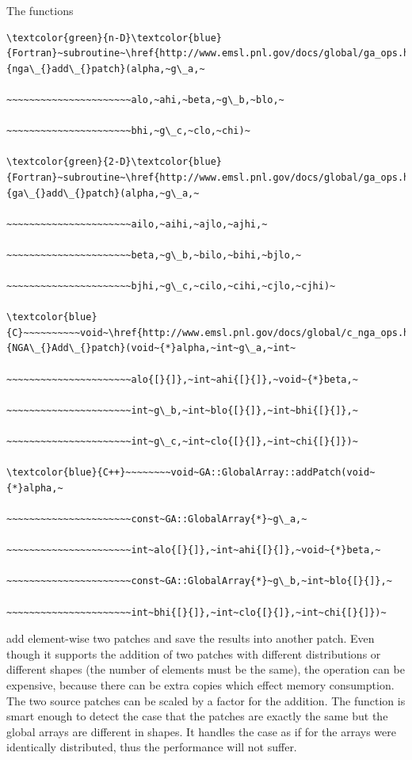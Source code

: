 The functions
\begin{verbatim}
\textcolor{green}{n-D}\textcolor{blue}{Fortran}~subroutine~\href{http://www.emsl.pnl.gov/docs/global/ga_ops.html\#ga_add_patch}{nga\_{}add\_{}patch}(alpha,~g\_a,~

~~~~~~~~~~~~~~~~~~~~~~alo,~ahi,~beta,~g\_b,~blo,~

~~~~~~~~~~~~~~~~~~~~~~bhi,~g\_c,~clo,~chi)~

\textcolor{green}{2-D}\textcolor{blue}{Fortran}~subroutine~\href{http://www.emsl.pnl.gov/docs/global/ga_ops.html\#ga_add_patch}{ga\_{}add\_{}patch}(alpha,~g\_a,~

~~~~~~~~~~~~~~~~~~~~~~ailo,~aihi,~ajlo,~ajhi,~

~~~~~~~~~~~~~~~~~~~~~~beta,~g\_b,~bilo,~bihi,~bjlo,~

~~~~~~~~~~~~~~~~~~~~~~bjhi,~g\_c,~cilo,~cihi,~cjlo,~cjhi)~

\textcolor{blue}{C}~~~~~~~~~~void~\href{http://www.emsl.pnl.gov/docs/global/c_nga_ops.html\#ga_add_patch}{NGA\_{}Add\_{}patch}(void~{*}alpha,~int~g\_a,~int~

~~~~~~~~~~~~~~~~~~~~~~alo{[}{]},~int~ahi{[}{]},~void~{*}beta,~

~~~~~~~~~~~~~~~~~~~~~~int~g\_b,~int~blo{[}{]},~int~bhi{[}{]},~

~~~~~~~~~~~~~~~~~~~~~~int~g\_c,~int~clo{[}{]},~int~chi{[}{]})~

\textcolor{blue}{C++}~~~~~~~~void~GA::GlobalArray::addPatch(void~{*}alpha,~

~~~~~~~~~~~~~~~~~~~~~~const~GA::GlobalArray{*}~g\_a,~

~~~~~~~~~~~~~~~~~~~~~~int~alo{[}{]},~int~ahi{[}{]},~void~{*}beta,~

~~~~~~~~~~~~~~~~~~~~~~const~GA::GlobalArray{*}~g\_b,~int~blo{[}{]},~

~~~~~~~~~~~~~~~~~~~~~~int~bhi{[}{]},~int~clo{[}{]},~int~chi{[}{]})~
\end{verbatim}
add element-wise two patches and save the results into another patch.
Even though it supports the addition of two patches with different
distributions or different shapes (the number of elements must be
the same), the operation can be expensive, because there can be extra
copies which effect memory consumption. The two source patches can
be scaled by a factor for the addition. The function is smart enough
to detect the case that the patches are exactly the same but the global
arrays are different in shapes. It handles the case as if for the
arrays were identically distributed, thus the performance will not
suffer.

